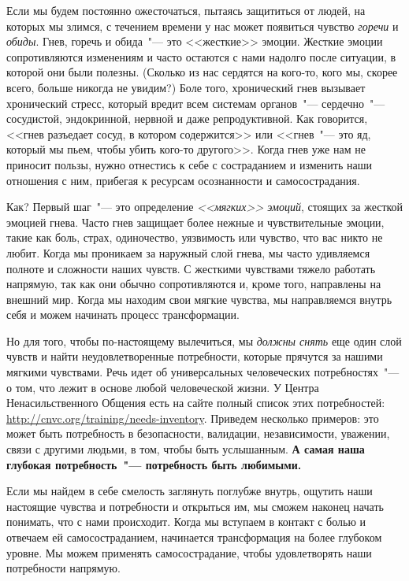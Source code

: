 Если мы будем постоянно ожесточаться, пытаясь защититься от людей, на которых мы злимся, с течением времени у нас может появиться чувство \emph{горечи} и \emph{обиды}. Гнев, горечь и обида~"--- это <<жесткие>> эмоции. Жесткие эмоции сопротивляются изменениям и часто остаются с нами надолго после ситуации, в которой они были полезны. (Сколько из нас сердятся на кого-то, кого мы, скорее всего, больше никогда не увидим?) Боле того, хронический гнев вызывает хронический стресс, который вредит всем системам органов~"--- сердечно~"--- сосудистой, эндокринной, нервной и даже репродуктивной. Как говорится, <<гнев разъедает сосуд, в котором содержится>> или <<гнев~"--- это яд, который мы пьем, чтобы убить кого-то другого>>. Когда гнев уже нам не приносит пользы, нужно отнестись к себе с состраданием и изменить наши отношения с ним, прибегая к ресурсам осознанности и самосострадания.

Как? Первый шаг~"--- это определение \emph{<<мягких>> эмоций}, стоящих за жесткой эмоцией гнева. Часто гнев защищает более нежные и чувствительные эмоции, такие как боль, страх, одиночество, уязвимость или чувство, что вас никто не любит. Когда мы проникаем за наружный слой гнева, мы часто удивляемся полноте и сложности наших чувств. С жесткими чувствами тяжело работать напрямую, так как они обычно сопротивляются и, кроме того, направлены на внешний мир. Когда мы находим свои мягкие чувства, мы направляемся внутрь себя и можем начинать процесс трансформации.

Но для того, чтобы по-настоящему вылечиться, мы \emph{должны снять} еще один слой чувств и найти неудовлетворенные потребности, которые прячутся за нашими мягкими чувствами. Речь идет об универсальных человеческих потребностях~"--- о том, что лежит в основе любой человеческой жизни. У Центра Ненасильственного Общения есть на сайте полный список этих потребностей: \url{http://cnvc.org/training/needs-inventory}. Приведем несколько примеров: это может быть потребность в безопасности, валидации, независимости, уважении, связи с другими людьми, в том, чтобы быть услышанным. \textbf{А самая наша глубокая потребность~"--- потребность быть любимыми.}

Если мы найдем в себе смелость заглянуть поглубже внутрь, ощутить наши настоящие чувства и потребности и открыться им, мы сможем наконец начать понимать, что с нами происходит. Когда мы вступаем в контакт с болью и отвечаем ей самосостраданием, начинается трансформация на более глубоком уровне. Мы можем применять самосострадание, чтобы удовлетворять наши потребности напрямую. 

